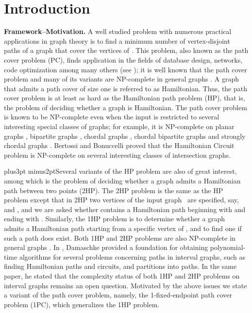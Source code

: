 \documentclass[10pt]{article}
\def\yskip{\penalty-50\vskip3pt plus3pt minus2pt}
\def\y{\yskip}
\begin{document}
\vskip 0.3in \section{Introduction}
{\bf Framework--Motivation.} A well studied problem with numerous
practical applications in graph theory is to find a minimum number
of vertex-disjoint paths of a graph  that cover the vertices of
. This problem, also known as the path cover problem (PC),
finds application in the fields of database design, networks, code
optimization among many others (see \cite{AdPe90, AR90, LiOlPru95,
SSSR93}); it is well known that the path cover problem and many of
its variants are NP-complete in general graphs \cite{GaJo79}. A
graph that admits a path cover of size one is referred to as
Hamiltonian. Thus, the path cover problem is at least as hard as
the Hamiltonian path problem (HP), that is, the problem of
deciding whether a graph is Hamiltonian. The path cover problem is
known to be NP-complete even when the input is restricted to
several interesting special classes of graphs; for example, it is
NP-complete on planar graphs \cite{GaJoTar}, bipartite graphs
\cite{Gol}, chordal graphs \cite{Gol}, chordal bipartite graphs
\cite{Muller} and strongly chordal graphs \cite{Muller}. Bertossi
and Bonuccelli \cite{BertBonucc} proved that the Hamiltonian
Circuit problem is NP-complete on several interesting classes of
intersection graphs.

\y Several variants of the HP problem are also of great interest,
among which is the problem of deciding whether a graph admits a
Hamiltonian path between two points (2HP). The 2HP problem is the
same as the HP problem except that in 2HP two vertices of the
input graph~ are specified, say,  and ,  and we are asked
whether  contains a Hamiltonian path beginning with  and
ending with . Similarly, the 1HP problem is to determine
whether a graph~ admits a Hamiltonian path starting from a
specific vertex  of , and to find one if such a path does
exist. Both 1HP and 2HP problems are also NP-complete in general
graphs \cite{GaJo79}. In \cite{Damaschke}, Damaschke provided a
foundation for obtaining polynomial-time algorithms for several
problems concerning paths in interval graphs, such as finding
Hamiltonian paths and circuits, and partitions into paths. In the
same paper, he stated that the complexity status of both 1HP and
2HP problems on interval graphs remains an open question.
Motivated by the above issues we state a variant of the path cover
problem, namely, the 1-fixed-endpoint path cover problem (1PC),
which generalizes the 1HP problem.
\end{document}
